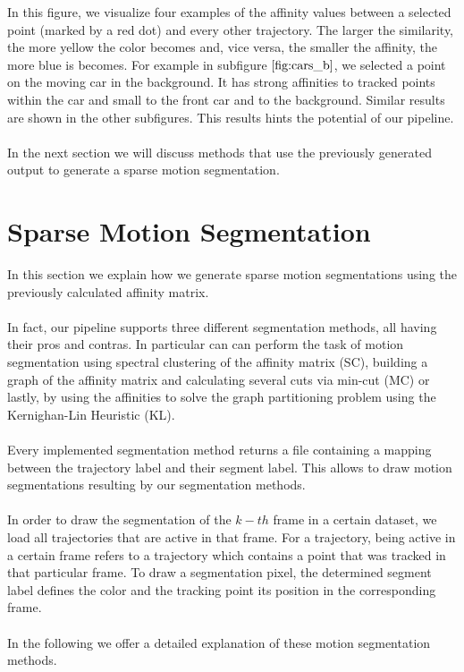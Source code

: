 In this figure, we visualize four examples of the affinity values between a selected point (marked by a red dot) and every other trajectory. The larger the similarity, the more yellow the color becomes and, vice versa,  the smaller the affinity, the more blue is becomes. For example in subfigure $\ref{fig:cars_b}$, we selected a point on the moving car in the background. It has strong affinities to tracked points within the car and small to the front car and to the background. Similar results are shown in the other subfigures. This results hints the potential of our pipeline. \\ \\
In the next section we will discuss methods that use the previously generated output to generate a sparse motion segmentation.

\section{Sparse Motion Segmentation}
In this section we explain how we generate sparse motion segmentations using the previously calculated affinity matrix. \\ \\
In fact, our pipeline supports three different segmentation methods, all having their pros and contras. In particular can can perform the task of motion segmentation using spectral clustering of the affinity matrix (SC), building a graph of the affinity matrix and calculating several cuts via min-cut (MC) or lastly, by using the affinities to solve the graph partitioning problem using the Kernighan-Lin Heuristic (KL). \\ \\
Every implemented segmentation method returns a file containing a mapping between the trajectory label and their segment label. This allows to draw motion segmentations resulting by our segmentation methods. \\ \\
In order to draw the segmentation of the $k-th$ frame in a certain dataset, we load all trajectories that are active in that frame. For a trajectory, being active in a certain frame refers to a trajectory which contains a point that was tracked in that particular frame. To draw a segmentation pixel, the determined segment label defines the color and the tracking point its position in the corresponding frame. \\ \\
In the following we offer a detailed explanation of these motion segmentation methods.
